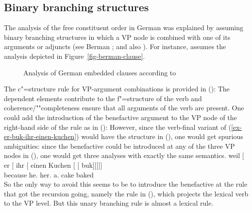 \subsection{Binary branching structures}

The analysis of the free constituent order in German was explained by assuming binary branching
structures in which a VP node is combined with one of its arguments or adjuncts (see Berman
\citeyear[Section~2.1.3.1]{Berman96a-u}; \citeyear{Berman2003a} and also
).
For instance, \citet[]{Berman2003a} assumes the analysis depicted in
Figure~\vref{fig-berman-clause}.
\begin{figure}
\caption{Analysis of German embedded clauses according to \citet[]{Berman2003a}}\label{fig-berman-clause}
\end{figure}  
The c"=structure rule for VP-argument combinations is provided in ():
\ea
\label{lfg-vp-regel-two}
\z
The dependent elements contribute to the f"=structure of the verb and coherence/""completeness ensure that all
arguments of the verb are present. One could add the introduction of the benefactive argument to
the VP node of the right-hand side of the rule as in ():
\ea
\label{lfg-vp-regel-three}
\z
However, since the verb-final variant of
(\ref{ex-er-buk-ihr-einen-kuchen}) would have the structure in (), one would get spurious
ambiguities: since the benefactive could be introduced at any of the three VP nodes in (),
one would get three analyses with exactly the same semantics.
\ea
\label{ex-er-ihr-einen-kuchen-buk}
\gll weil    [ er [ ihr [ einen Kuchen [ [ buk]]]]]\\
     because {}        he.\nom{} {}        her.\dat{} {}        a.\acc{} cake       {}        {}       baked\\
\z
So the only way to avoid this seems to be to introduce the benefactive at the rule that got the recursion
going, namely the rule in (), which projects the lexical verb to the VP level.
\ea
\label{LFG-v-vp-two}
\z
But this unary branching rule is almost a lexical rule. 

